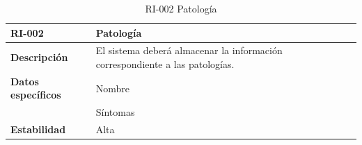 \begin{table}[htpb]
\centering
\begin{tabularx}{\textwidth}{|l|X|}
\hline
\textbf{RI-002}            & \textbf{Patología                                                                   } \\ \hline
\textbf{Descripción}       & El sistema deberá almacenar la información correspondiente a las patologías. \\ \hline
\textbf{Datos específicos} & Nombre                                                                       \\ 
                  & Síntomas                                                                     \\ \hline
\textbf{Estabilidad}       & Alta                                                                         \\ \hline
\end{tabularx}
\caption{RI-002 Patología}
\end{table}


